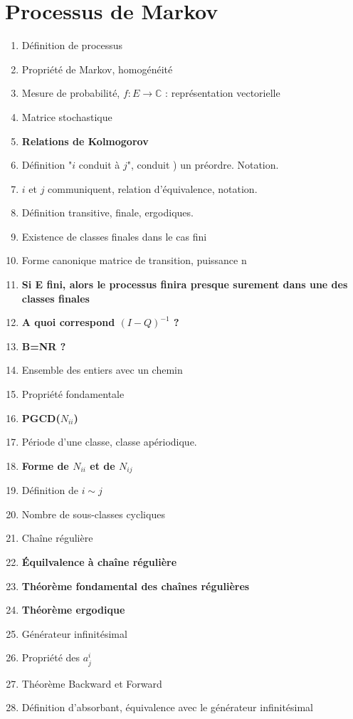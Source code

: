 \documentclass{article}
\begin{document}
\part{Processus de Markov}
\begin{enumerate}
\item Définition de processus
\item Propriété de Markov, homogénéité
\item Mesure de probabilité, $f:E\to\mathbb{C}$ : représentation vectorielle
\item Matrice stochastique
\item \textbf{Relations de Kolmogorov}
\item Définition "$i$ conduit à $j$", conduit ) un préordre. Notation.
\item $i$ et $j$ communiquent, relation d'équivalence, notation.
\item Définition transitive, finale, ergodiques.
\item Existence de classes finales dans le cas fini
\item Forme canonique matrice de transition, puissance n
\item \textbf{Si E fini, alors le processus finira presque surement dans une des classes finales}
\item \textbf{A quoi correspond $(I-Q)^{-1}$ ?}
\item \textbf{B=NR ?}
\item Ensemble des entiers avec un chemin
\item Propriété fondamentale
\item \textbf{PGCD($N_{ii}$)}
\item Période d'une classe, classe apériodique.
\item \textbf{Forme de $N_{ii}$ et de $N_{ij}$}
\item Définition de $i\sim j$
\item Nombre de sous-classes cycliques
\item Chaîne régulière
\item \textbf{Équilvalence à chaîne régulière}
\item \textbf{Théorème fondamental des chaînes régulières}
\item \textbf{Théorème ergodique}
\item Générateur infinitésimal
\item Propriété des $a_j^i$
\item Théorème Backward et Forward
\item Définition d'absorbant, équivalence avec le générateur infinitésimal

\end{enumerate}
\end{document}
